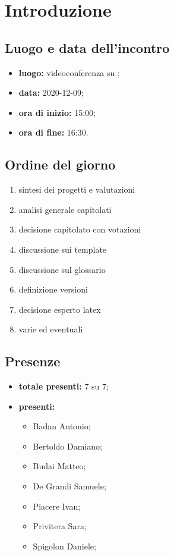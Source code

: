 \section*{Introduzione}

\subsection*{Luogo e data dell'incontro}
\begin{itemize}
	\item \textbf{luogo:} videoconferenza su ;
	\item \textbf{data:} 2020-12-09;
	\item \textbf{ora di inizio:} 15:00;
	\item \textbf{ora di fine:} 16:30.
\end{itemize}

\subsection*{Ordine del giorno}
	\begin{enumerate}
	\item sintesi dei progetti e valutazioni
	\item analisi generale capitolati
	\item decisione capitolato con votazioni
	\item discussione sui template
	\item discussione sul glossario
	\item definizione versioni
	\item decisione esperto latex
	\item varie	ed eventuali
\end{enumerate}

\subsection*{Presenze}
\begin{itemize}
	\item \textbf{totale presenti:} 7 su 7;
	\item \textbf{presenti: }
	\begin{itemize}
		\item Badan Antonio;
		\item Bertoldo Damiano;
		\item Budai Matteo;
		\item De Grandi Samuele;
		\item Piacere Ivan;
		\item Privitera Sara;
		\item Spigolon Daniele;
	\end{itemize}
\end{itemize}

